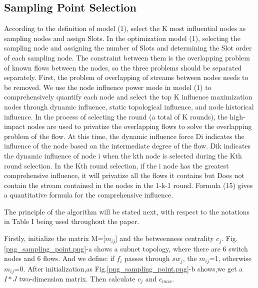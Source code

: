 \documentclass[conference,compsoc]{IEEEtran}
\begin{document}
\subsection{Sampling Point Selection} 

According to the definition of model (1), select the K most influential nodes as sampling nodes and assign Slots.
In the optimization model (1), selecting the sampling node and assigning the number of Slots and determining the Slot order of each sampling node. The constraint between them is the overlapping problem of known flows between the nodes, so the three problems should be separated separately. First, the problem of overlapping of streams between nodes needs to be removed. We use the node influence power mode in model (1) to comprehensively quantify each node and select the top K influence maximization nodes through dynamic influence, static topological influence, and node historical influence. In the process of selecting the round (a total of K rounds), the high-impact nodes are used to privatize the overlapping flows to solve the overlapping problem of the flow. At this time, the dynamic influence force Di indicates the influence of the node based on the intermediate degree of the flow. Dik indicates the dynamic influence of node i when the kth node is selected during the Kth round selection. In the Kth round selection, if the i node has the greatest comprehensive influence, it will privatize all the flows it contains but Does not contain the stream contained in the nodes in the 1-k-1 round.
Formula (15) gives a quantitative formula for the comprehensive influence.

The principle of the algorithm will be stated next, with respect to the notations in Table I being used throughout the paper.

Firstly, initialize the matrix M=[$m_{ij}$] and the betweenness centrality $c_j$. Fig.\ref{png_sampling_point.png}-a shows a subnet topology, where there are 6 switch nodes and 6 flows. And we define: if $f_i$ passes through $sw_j$, the $m_{ij}$=1, otherwise $m_{ij}$=0. After initialization,as Fig.\ref{png_sampling_point.png}-b shows,we get a $I \ast J$ two-dimension matrix. Then calculate $c_j$ and $c_{max}$.
\end{document}
